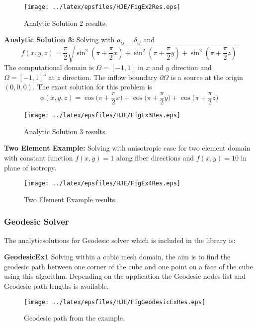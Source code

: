 \begin{figure}[h]
  \centering
    \texttt{[image: ../latex/epsfiles/HJE/FigEx2Res.eps]}
  \caption{Analytic Solution 2 results.}
  \label{fig:Ex2}
\end{figure}


\textbf{Analytic Solution 3:} Solving with $a_{ij}=\delta_{ij}$ and $$f(x,y,z)=\frac{\pi}{2} \sqrt{\sin^2{(\pi + \frac{\pi}{2}x)}+\sin^2{(\pi + \frac{\pi}{2}y)}+\sin^2{(\pi + \frac{\pi}{2}z)}}$$ The computational domain is $\Omega=[-1,1]$ in $x$ and $y$ direction and $\Omega=[-1,1]^3$ at $z$ direction. The inflow boundary $\partial\Omega$ is a source at the origin $(0,0,0)$. The exact solution for this problem is $$\phi(x,y,z)=\cos{(\pi + \frac{\pi}{2}x})+\cos{(\pi + \frac{\pi}{2}y})+\cos{(\pi + \frac{\pi}{2}z})$$

\begin{figure}[h]
  \centering
    \texttt{[image: ../latex/epsfiles/HJE/FigEx3Res.eps]}
  \caption{Analytic Solution 3 results.}
  \label{fig:Ex3}
\end{figure}


\textbf{Two Element Example:} Solving with anisotropic case for two element domain with constant function $f(x,y)=1$ along fiber directions and $f(x,y)=10$ in plane of isotropy.

\begin{figure}[h]
  \centering
    \texttt{[image: ../latex/epsfiles/HJE/FigEx4Res.eps]}
  \caption{Two Element Example results.}
  \label{fig:Ex4}
\end{figure}


\subsubsection{Geodesic Solver}

\noindent The analyticsolutions for Geodesic solver which is included in the library is:

\textbf{GeodesicEx1} Solving within a cubic mesh domain, the aim is to find the geodesic path between one corner of the cube and one point on a face of the cube using this algorithm.
Depending on the application the Geodesic nodes list and Geodesic path lengths is available.

\begin{figure}[h]
  \centering
    \texttt{[image: ../latex/epsfiles/HJE/FigGeodesicExRes.eps]}
  \caption{Geodesic path from the example.}
  \label{fig:GeodesicEx}
\end{figure}

